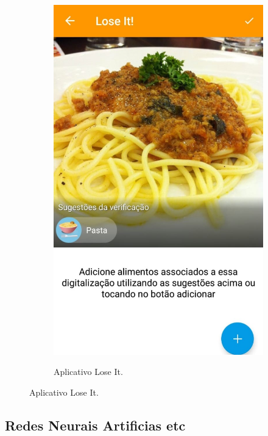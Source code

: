 \begin{figure}[!ht]
\begin{subfigure}{0.4\textwidth}
  \label{fig:subApps1}
\end{subfigure}%
\hspace{.1\textwidth}
\begin{subfigure}{0.4\textwidth}
  \centering
    \caption{Aplicativo Lose It.}
  \includegraphics[width=\textwidth]{imgs/loseit.jpeg}
  \label{fig:subApps2}
\end{subfigure}

\label{fig:test}
\end{figure}


\subsection{Redes Neurais Artificias etc \label{subsec:nn}}


